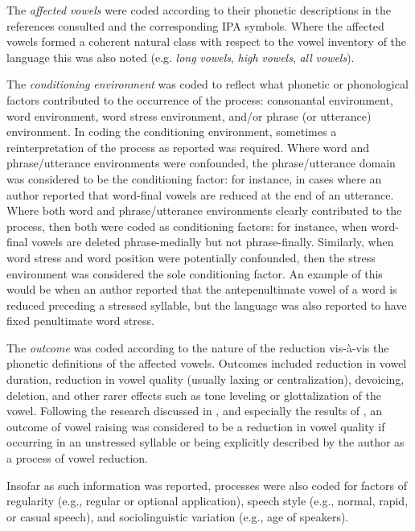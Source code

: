   The \textit{affected} \textit{vowels} were coded according to their phonetic descriptions in the references consulted and the corresponding IPA symbols. Where the affected vowels formed a coherent natural class with respect to the vowel inventory of the language this was also noted (e.g. \textit{long} \textit{vowels}, \textit{high} \textit{vowels}, \textit{all} \textit{vowels}).

  The \textit{conditioning} \textit{environment} was coded to reflect what phonetic or phonological factors contributed to the occurrence of the process: consonantal environment, word environment, word stress environment, and/or phrase (or utterance) environment. In coding the conditioning environment, sometimes a reinterpretation of the process as reported was required. Where word and phrase/utterance environments were confounded, the phrase/utterance domain was considered to be the conditioning factor: for instance, in cases where an author reported that word-final vowels are reduced at the end of an utterance. Where both word and phrase/utterance environments clearly contributed to the process, then both were coded as conditioning factors: for instance, when word-final vowels are deleted phrase-medially but not phrase-finally. Similarly, when word stress and word position were potentially confounded, then the stress environment was considered the sole conditioning factor. An example of this would be when an author reported that the antepenultimate vowel of a word is reduced preceding a stressed syllable, but the language was also reported to have fixed penultimate word stress.

  The \textit{outcome} was coded according to the nature of the reduction vis-à{}-vis the phonetic definitions of the affected vowels. Outcomes included reduction in vowel duration, reduction in vowel quality (usually laxing or centralization), devoicing, deletion, and other rarer effects such as tone leveling or glottalization of the vowel. Following the research discussed in , and especially the results of \citet{KapatsinskiEtAl2019}, an outcome of vowel raising was considered to be a reduction in vowel quality if occurring in an unstressed syllable or being explicitly described by the author as a process of vowel reduction.

  Insofar as such information was reported, processes were also coded for factors of regularity (e.g., regular or optional application), speech style (e.g., normal, rapid, or casual speech), and sociolinguistic variation (e.g., age of speakers).

